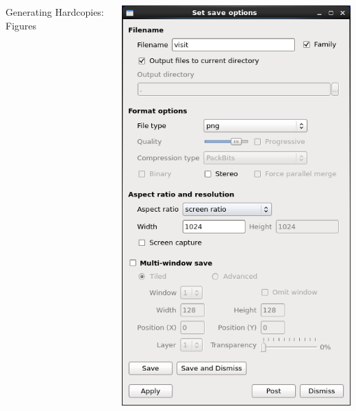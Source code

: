 \begin{frame}
\begin{columns}
\begin{column}{5.75cm}
\begin{block}{Generating Hardcopies: Figures}
\begin{enumerate}
	\end{enumerate}
	\end{block}
\end{column}
\begin{column}{5cm}
	\includegraphics[width=\columnwidth]{figs/visit-guis/visit_saveOpts}
\end{column}
\end{columns}

\end{frame}





